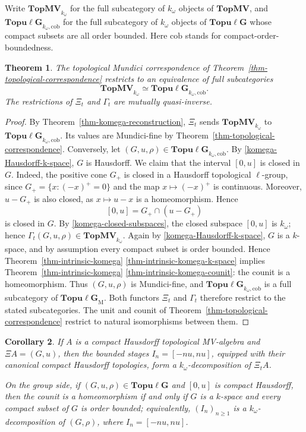 \documentclass[preprint,3p]{elsarticle}
\theoremstyle{plain}
\newtheorem{thm}{Theorem}[section]
\newtheorem{cor}[thm]{Corollary}
\theoremstyle{definition}
\newcommand{\TopMV}{\mathbf{TopMV}}
\newcommand{\Topulg}{\mathbf{Topu\ell G}}
\newcommand{\TopMVkw}{\mathbf{TopMV}_{k_\omega}}
\newcommand{\Topulgkw}{\mathbf{Topu\ell G}_{k_\omega,\mathrm{cob}}}
\newcommand{\TopulgM}{\mathbf{Topu\ell G}_{\mathrm{M}}}
\numberwithin{equation}{section}
\begin{document}
Write $\TopMVkw$ for the full subcategory of $k_\omega$ objects of
$\TopMV$, and $\Topulgkw$ for the full subcategory of $k_\omega$
objects of $\Topulg$ whose compact subsets are all order bounded.
Here $\mathrm{cob}$ stands for compact-order-boundedness.

\begin{thm}
\label{thm-komega-equivalence}
The topological Mundici correspondence of
Theorem~\ref{thm-topological-correspondence} restricts to an equivalence
of full subcategories
\[
 \TopMVkw\simeq\Topulgkw.
\]
The restrictions of $\Xi_t$ and $\Gamma_t$ are mutually quasi-inverse.
\end{thm}

\begin{proof}
By Theorem~\ref{thm-komega-reconstruction}, $\Xi_t$ sends
$\TopMVkw$ to $\Topulgkw$.  Its values are Mundici-fine by
Theorem~\ref{thm-topological-correspondence}.
Conversely, let $(G,u,\rho)\in\Topulgkw$.  By
\ref{komega-Hausdorff-k-space}, $G$ is Hausdorff.  
We claim that the interval $[0,u]$ is closed in $G$. 
Indeed, the positive cone $G_+$ is closed in a Hausdorff
topological $\ell$-group, since
$G_+=\{x:(-x)^+=0\}$ and the map $x\mapsto(-x)^+$
is continuous.  Moreover, $u-G_+$ is also closed,
as $x\mapsto u-x$ is a homeomorphism.  Hence
\[
 [0,u]=G_+\cap(u-G_+)
\]
is closed in $G$.
By \ref{komega-closed-subspaces}, the closed subspace $[0,u]$ is
$k_\omega$; hence $\Gamma_t(G,u,\rho)\in\TopMVkw$.
Again by \ref{komega-Hausdorff-k-space}, $G$ is a $k$-space, and by
assumption every compact subset is order bounded.  Hence
Theorem~\ref{thm-intrinsic-komega}%
\ref{thm-intrinsic-komega-k-space} implies
Theorem~\ref{thm-intrinsic-komega}%
\ref{thm-intrinsic-komega-counit}: the counit is a homeomorphism.
Thus $(G,u,\rho)$ is Mundici-fine, and
$\Topulgkw$ is a full subcategory of $\TopulgM$.
Both functors $\Xi_t$ and $\Gamma_t$ therefore restrict to the stated
subcategories.  The unit and counit of
Theorem~\ref{thm-topological-correspondence} restrict to natural
isomorphisms between them.
\end{proof}

\begin{cor}
\label{cor-compact-reconstruction}
If $A$ is a compact Hausdorff topological MV-algebra and
$\Xi A=(G,u)$, then the bounded stages
$I_n=[-nu,nu]$, equipped with their canonical
compact Hausdorff topologies, form a
$k_\omega$-decomposition of $\Xi_tA$.

On the group side, if $(G,u,\rho)\in\Topulg$ and $[0,u]$ is compact
Hausdorff, then the counit is a homeomorphism if and only if
$G$ is a $k$-space and every compact subset of $G$ is order bounded;
equivalently, $(I_n)_{n\geq1}$ is a $k_\omega$-decomposition of $(G,\rho)$,
where $I_n=[-nu,nu]$.
\end{cor}
\end{document}

